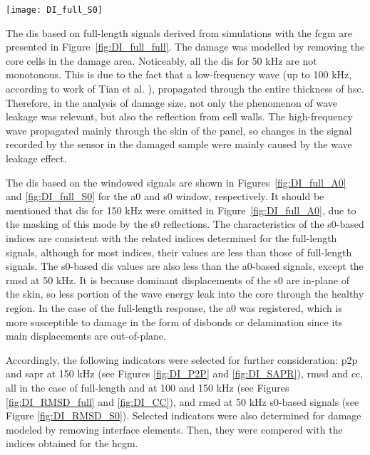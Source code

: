\documentclass[a4paper,fleqn]{cas-dc}
\begin{document}
\begin{figure*}[!tbh]
	\begin{center}
		\texttt{[image: DI\_full\_S0]}
	\end{center}
	\caption{The \aclp{di} obtained with the \acl{fcgm} based on the \acs{s0} windowed signal}
	\label{fig:DI_full_S0}
\end{figure*}

The \acp{di} based on full-length signals derived from simulations with the \ac{fcgm} are presented in Figure~\ref{fig:DI_full_full}.
The damage was modelled by removing the core cells in the damage area.
Noticeably, all the \acp{di} for 50 \unit{\kHz} are not monotonous.
This is due to the fact that a low-frequency wave (up to 100 \unit{\kHz}, according to work of Tian et al. \cite{tian2015wavenumber}), propagated through the entire thickness of \ac{hsc}.
Therefore, in the analysis of damage size, not only the phenomenon of wave leakage was relevant, but also the reflection from cell walls.  
The high-frequency wave propagated mainly through the skin of the panel, so changes in the signal recorded by the sensor in the damaged sample were mainly caused by the wave leakage effect.

The \acp{di} based on the windowed signals are shown in Figures~\ref{fig:DI_full_A0} and \ref{fig:DI_full_S0} for the \ac{a0} and \ac{s0} window, respectively.
It should be mentioned that \acp{di} for 150 \unit{\kHz} were omitted in Figure~\ref{fig:DI_full_A0}, due to the masking of this mode by the \ac{s0} reflections.
The characteristics of the \ac{s0}-based indices are consistent with the related indices determined for the full-length signals, although for most indices, their values are less than those of full-length signals.
The \ac{s0}-based \acp{di} values are also less than the \ac{a0}-based signals, except the \ac{rmsd} at 50 \unit{kHz}.
It is because dominant displacements of the \ac{s0} are in-plane of the skin, so less portion of the wave energy leak into the core through the healthy region.
In the case of the full-length response, the \ac{a0} was registered, which is more susceptible to damage in the form of disbonds or delamination since its main displacements are out-of-plane.

Accordingly, the following indicators were selected for further consideration: \ac{p2p} and \ac{sapr} at 150 \unit{kHz} (see Figures \ref{fig:DI_P2P} and \ref{fig:DI_SAPR}), \ac{rmsd} and \ac{cc}, all in the case of full-length and at 100 and 150 \unit{\kHz} (see Figures \ref{fig:DI_RMSD_full} and \ref{fig:DI_CC}), and \ac{rmsd} at 50 \unit{kHz} \ac{s0}-based signals (see Figure \ref{fig:DI_RMSD_S0}).
Selected indicators were also determined for damage modeled by removing interface elements. Then, they were compered with the indices obtained for the \ac{hcgm}.
\end{document}
